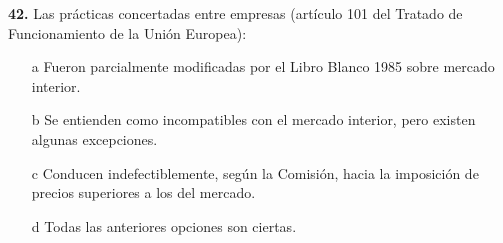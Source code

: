 \documentclass{nuevotema}
\begin{document}
\preguntas

\textbf{42.} Las prácticas concertadas entre empresas (artículo 101 del Tratado de Funcionamiento de la Unión Europea):

\begin{itemize}
	\item[a] Fueron parcialmente modificadas por el Libro Blanco 1985 sobre mercado interior.
	\item[b] Se entienden como incompatibles con el mercado interior, pero existen algunas excepciones.
	\item[c] Conducen indefectiblemente, según la Comisión, hacia la imposición de precios superiores a los del mercado.
	\item[d] Todas las anteriores opciones son ciertas.
\end{itemize}
\end{document}
